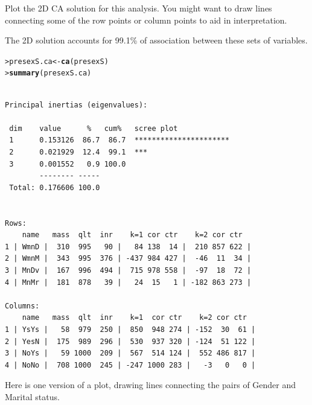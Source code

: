 \documentclass[10pt]{report}\usepackage[]{graphicx}\usepackage[]{color}
\makeatletter
\newcommand{\hlstd}[1]{\textcolor[rgb]{0.345,0.345,0.345}{#1}}%
\newcommand{\hlkwb}[1]{\textcolor[rgb]{0.69,0.353,0.396}{#1}}%
\newcommand{\hlkwd}[1]{\textcolor[rgb]{0.737,0.353,0.396}{\textbf{#1}}}%
\newenvironment{kframe}{%
 \def\at@end@of@kframe{}%
 \ifinner\ifhmode%
  \def\at@end@of@kframe{\end{minipage}}%
  \begin{minipage}{\columnwidth}%
 \fi\fi%
 \def\FrameCommand##1{\hskip\@totalleftmargin \hskip-\fboxsep
 \colorbox{shadecolor}{##1}\hskip-\fboxsep
     \hskip-\linewidth \hskip-\@totalleftmargin \hskip\columnwidth}%
 \MakeFramed {\advance\hsize-\width
   \@totalleftmargin\z@ \linewidth\hsize
   \@setminipage}}%
 {\par\unskip\endMakeFramed%
 \at@end@of@kframe}
\newenvironment{knitrout}{}{} %
\renewenvironment{knitrout}{\small\renewcommand{\baselinestretch}{.85}}{} %
\makeatother
\begin{document}
\begin{Exercises}
\begin{enumerate*}
  	  \item Plot the 2D CA solution for this analysis.  You might want to draw lines connecting
  	  some of the row points or column points to aid in interpretation.
  	  \begin{ans}
  	  The 2D solution accounts for 99.1\% of association between these sets of variables.
\begin{knitrout}\footnotesize
{}\color{fgcolor}\begin{kframe}
\begin{alltt}
\hlstd{> }\hlstd{presexS.ca} \hlkwb{<-} \hlkwd{ca}\hlstd{(presexS)}
\hlstd{> }\hlkwd{summary}\hlstd{(presexS.ca)}
\end{alltt}
\begin{verbatim}

Principal inertias (eigenvalues):

 dim    value      %   cum%   scree plot               
 1      0.153126  86.7  86.7  **********************   
 2      0.021929  12.4  99.1  ***                      
 3      0.001552   0.9 100.0                           
        -------- -----                                 
 Total: 0.176606 100.0                                 


Rows:
    name   mass  qlt  inr    k=1 cor ctr    k=2 cor ctr  
1 | WmnD |  310  995   90 |   84 138  14 |  210 857 622 |
2 | WmnM |  343  995  376 | -437 984 427 |  -46  11  34 |
3 | MnDv |  167  996  494 |  715 978 558 |  -97  18  72 |
4 | MnMr |  181  878   39 |   24  15   1 | -182 863 273 |

Columns:
    name   mass  qlt  inr    k=1  cor ctr    k=2 cor ctr  
1 | YsYs |   58  979  250 |  850  948 274 | -152  30  61 |
2 | YesN |  175  989  296 |  530  937 320 | -124  51 122 |
3 | NoYs |   59 1000  209 |  567  514 124 |  552 486 817 |
4 | NoNo |  708 1000  245 | -247 1000 283 |   -3   0   0 |
\end{verbatim}
\end{kframe}
\end{knitrout}
      Here is one version of a plot, drawing lines connecting the pairs of Gender and Marital
      status.
      

\end{ans}
\end{enumerate*}
\end{Exercises}
\end{document}
